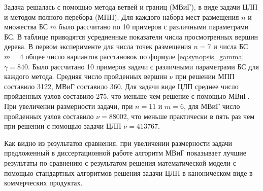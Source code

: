   
Задача решалась с помощью метода ветвей и границ (МВиГ), в виде задачи ЦЛП и методом полного перебора (МПП). Для каждого набора мест размещения $n$ и множества БС $m$  было рассчитано по 10 примеров с различными параметрами БС. В таблице приводятся усредненные показатели числа просмотренных вершин дерева. В первом эксперименте для числа точек размещения $n=7$ и числа БС $m=4$ общее число вариантов расстановок по формуле \cref{eq:synopsis_gamma} $\gamma = 840$. Было рассчитано 10 примеров задачи с различными параметрами БС для каждого метода. Средняя число пройденных вершин $\nu$ при решении МПП составило 3122, МВиГ составило 360. Для задачи виде ЦЛП  среднее число пройденных узлов составило 275, что меньше чем решение с помощью МВиГ. При увеличении размерности задачи, при $n=11$ и $m=6$,  для МВиГ число пройденных узлов составило $\nu = 88002$, что меньше практически в пять раз чем при решении с помощью задачи ЦЛП $\nu=413767$.

Как видно из результатов сравнения, при увеличении размерности задачи предложенный в диссертационной работе алгоритм МВиГ показывает лучшие результаты по сравнению с результатом решения математической модели с помощью стандартных алгоритмов решения задачи ЦЛП в каноническом виде в коммерческих продуктах.



